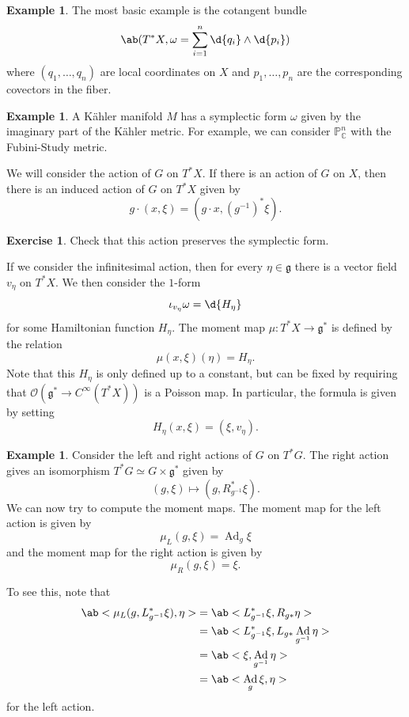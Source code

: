 \documentclass{amsart}
\theoremstyle{definition}
\newtheorem{exm}[thm]{Example}
\newtheorem{exer}[thm]{Exercise}
\theoremstyle{remark}
\theoremstyle{plain}
\theoremstyle{definition}
\theoremstyle{remark}
\newcommand{\C}{\mathbb{C}}
\renewcommand{\P}{\mathbb{P}}
\newcommand{\g}{\mathfrak{g}}
\newcommand{\mc}[1]{\mathcal{#1}}
\newcommand{\1}{\mathbf{1}}
\newcommand{\2}{\mathbf{2}}
\newcommand{\3}{\mathbf{3}}
\DeclareMathOperator{\Ad}{Ad}
\begin{document}
\begin{exm}
    The most basic example is the cotangent bundle
    \[ \ab(T^* X, \omega = \sum_{i=1}^n \d{q_i} \wedge \d{p_i}) \]
    where \((q_1, \ldots, q_n)\) are local coordinates on \(X\) and \(p_1, \ldots, p_n\) are the corresponding covectors in the fiber.
\end{exm}

\begin{exm}
    A K\"ahler manifold \(M\) has a symplectic form \(\omega\) given by the imaginary part of the K\"ahler metric. For example, we can consider \(\P^n_{\C}\) with the Fubini-Study metric.
\end{exm}

We will consider the action of \(G\)  on \(T^* X\). If there is an action of \(G\) on \(X\), then there is an induced action of \(G\) on \(T^* X\) given by
\[ g \cdot (x, \xi) = (g \cdot x, (g^{-1})^* \xi). \]

\begin{exer}
    Check that this action preserves the symplectic form.
\end{exer}

If we consider the infinitesimal action, then for every \(\eta \in\g\) there is a vector field \(v_{\eta}\) on \(T^* X\). We then consider the \(1\)-form
\[ \iota_{v_{\eta}} \omega = \d{H_{\eta}} \]
for some Hamiltonian function \(H_{\eta}\). The moment map \(\mu \colon T^* X \to \g^*\) is defined by the relation
\[ \mu(x, \xi)(\eta) = H_{\eta}. \]
Note that this \(H_{\eta}\) is only defined up to a constant, but can be fixed by requiring that \(\mc{O}(\g^* \to C^{\infty}(T^* X))\) is a Poisson map. In particular, the formula is given by setting
\[ H_{\eta}(x, \xi) = (\xi, v_{\eta}). \]

\begin{exm}
    Consider the left and right actions of \(G\) on \(T^* G\). The right action gives an isomorphism \(T^* G \simeq G \times \g^*\) given by
    \[ (g, \xi) \mapsto (g, R_{g^{-1}}^* \xi). \]
    We can now try to compute the moment maps. The moment map for the left action is given by
    \[ \mu_L (g, \xi) = \Ad_g \xi \]
    and the moment map for the right action is given by
    \[ \mu_R (g, \xi) = \xi. \]

    To see this, note that
    \begin{align*}
        \ab< \mu_L(g, L_{g^{-1}}^* \xi), \eta> &= \ab< L_{g^{-1}}^* \xi, R_{g*} \eta> \\
        &= \ab< L_{g^{-1}}^* \xi, L_{g*} \Ad_{g^{-1}} \eta> \\
        &= \ab< \xi, \Ad_{g^{-1}} \eta> \\
        &= \ab< \Ad_g \xi, \eta>
    \end{align*}
    for the left action.
\end{exm}
\end{document}
